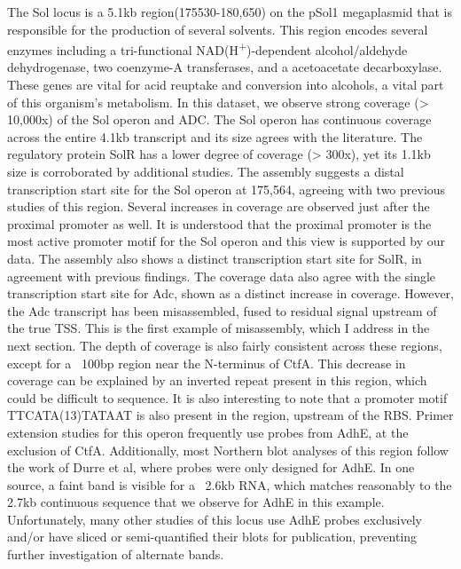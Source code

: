 The Sol locus is a 5.1kb region(175530-180,650) on the pSol1 megaplasmid that is responsible for the production of several solvents. This region encodes several enzymes including a tri-functional NAD(H\textsuperscript{+})-dependent alcohol/aldehyde dehydrogenase, two coenzyme-A transferases, and a acetoacetate decarboxylase. These genes are vital for acid reuptake and conversion into alcohols, a vital part of this organism's metabolism.
In this dataset, we observe strong coverage (> 10,000x) of the Sol operon and ADC. The Sol operon has continuous coverage across the entire 4.1kb transcript and its size agrees with the literature. The regulatory protein SolR has a lower degree of coverage (> 300x), yet its 1.1kb size is corroborated by additional studies.
The assembly suggests a distal transcription start site for the Sol operon at 175,564, agreeing with two previous studies of this region. Several increases in coverage are observed just after the proximal promoter as well. It is understood that the proximal promoter is the most active promoter motif for the Sol operon and this view is supported by our data. The assembly also shows a distinct transcription start site for SolR, in agreement with previous findings. The coverage data also agree with the single transcription start site for Adc, shown as a distinct increase in coverage. However, the Adc transcript has been misassembled, fused to residual signal upstream of the true TSS. This is the first example of misassembly, which I address in the next section.
The depth of coverage is also fairly consistent across these regions, except for a ~100bp region near the N-terminus of CtfA. This decrease in coverage can be explained by an inverted repeat present in this region, which could be difficult to sequence. It is also interesting to note that a promoter motif TTCATA(13)TATAAT is also present in the region, upstream of the RBS. Primer extension studies for this operon frequently use probes from AdhE, at the exclusion of CtfA. Additionally, most Northern blot analyses of this region follow the work of Durre et al, where probes were only designed for AdhE. In one source, a faint band is visible for a ~2.6kb RNA, which matches reasonably to the 2.7kb continuous sequence that we observe for AdhE in this example. Unfortunately, many other studies of this locus use AdhE probes exclusively and/or have sliced or semi-quantified their blots for publication, preventing further investigation of alternate bands.



